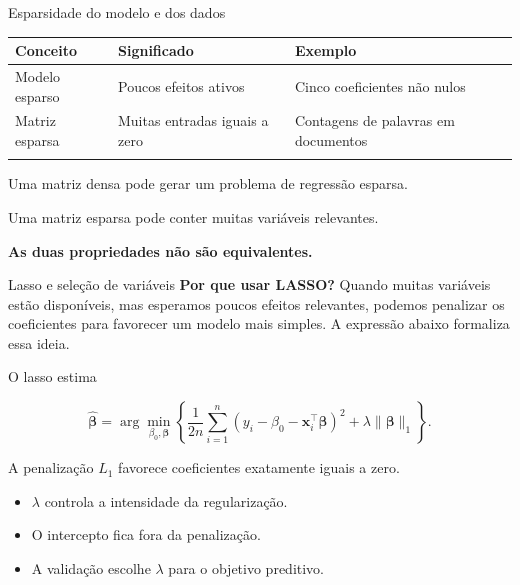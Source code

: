 \documentclass[
  10pt,
  ignorenonframetext,
  aspectratio=169,
  brazilian,
]{beamer}
\newcounter{none} %
\providecommand{\tightlist}{%
  \setlength{\itemsep}{0pt}\setlength{\parskip}{0pt}}
\begin{document}
\begin{frame}{Esparsidade do modelo e dos dados}
\protect{}\label{esparsidade-do-modelo-e-dos-dados}
{\def\LTcaptype{none} %
\begin{longtable}[]{@{}
  >{\raggedright\arraybackslash}p{}
  >{\raggedright\arraybackslash}p{}
  >{\raggedright\arraybackslash}p{}@{}}
\toprule\noalign{}
\begin{minipage}[b]{\linewidth}\raggedright
Conceito
\end{minipage} & \begin{minipage}[b]{\linewidth}\raggedright
Significado
\end{minipage} & \begin{minipage}[b]{\linewidth}\raggedright
Exemplo
\end{minipage} \\
\midrule\noalign{}
\endhead
Modelo esparso & Poucos efeitos ativos & Cinco coeficientes não nulos \\
Matriz esparsa & Muitas entradas iguais a zero & Contagens de palavras
em documentos \\
\bottomrule\noalign{}
\end{longtable}
}

Uma matriz densa pode gerar um problema de regressão esparsa.

Uma matriz esparsa pode conter muitas variáveis relevantes.

\textbf{As duas propriedades não são equivalentes.}
\end{frame}

\begin{frame}{Lasso e seleção de variáveis}
\protect{}\label{lasso-e-seleuxe7uxe3o-de-variuxe1veis}
\textbf{Por que usar LASSO?} Quando muitas variáveis estão disponíveis,
mas esperamos poucos efeitos relevantes, podemos penalizar os
coeficientes para favorecer um modelo mais simples. A expressão abaixo
formaliza essa ideia.

O lasso estima

\[
\boxed{
\hat{\boldsymbol\beta}=
\arg\min_{\beta_0,\boldsymbol\beta}
\left\{
\frac{1}{2n}\sum_{i=1}^{n}
(y_i-\beta_0-\mathbf x_i^\top\boldsymbol\beta)^2
+\lambda\|\boldsymbol\beta\|_1
\right\}.
}
\]

A penalização \(L_1\) favorece coeficientes exatamente iguais a zero.

\begin{itemize}
\tightlist
\item
  \(\lambda\) controla a intensidade da regularização.
\item
  O intercepto fica fora da penalização.
\item
  A validação escolhe \(\lambda\) para o objetivo preditivo.
\end{itemize}
\end{frame}
\end{document}
